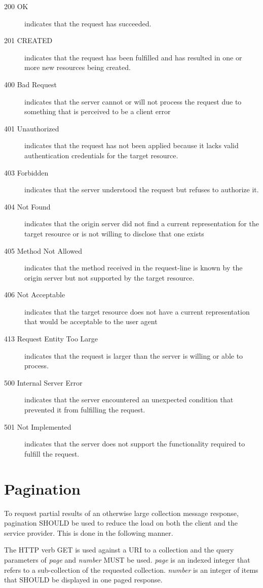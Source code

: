 \documentclass[10pt,a4paper]{article}
\begin{document}
\begin{description}
\item[200 OK] indicates that the request has succeeded.
\item[201 CREATED] indicates that the request has been fulfilled and has resulted in one or more new resources being created.
\item[400 Bad Request] indicates that the server cannot or will not process the request due to something that is perceived to be a client error
\item[401 Unauthorized] indicates that the request has not been applied because it lacks valid authentication credentials for the target resource.
\item[403 Forbidden] indicates that the server understood the request but refuses to authorize it.
\item[404 Not Found] indicates that the origin server did not find a current representation for the target resource or is not willing to disclose that one exists
\item[405 Method Not Allowed] indicates that the method received in the request-line is known by the origin server but not supported by the target resource.
\item[406 Not Acceptable] indicates that the target resource does not have a current representation that would be acceptable to the user agent
\item[413 Request Entity Too Large] indicates that the request is larger than the server is willing or able to process.
\item[500 Internal Server Error] indicates that the server encountered an unexpected condition that prevented it from fulfilling the request.
\item[501 Not Implemented] indicates that the server does not support the functionality required to fulfill the request.
\end{description}

\section{Pagination}

To request partial results of an otherwise large collection message response, pagination SHOULD be used to reduce the load on
both the client and the service provider. This is done in the following manner.

The HTTP verb GET is used against a URI to a collection and the query parameters of {\em page} and {\em number} MUST be used. {\em page} is an indexed
integer that refers to a sub-collection of the requested collection. {\em number} is an integer of items that SHOULD be displayed in one paged response.
\end{document}
